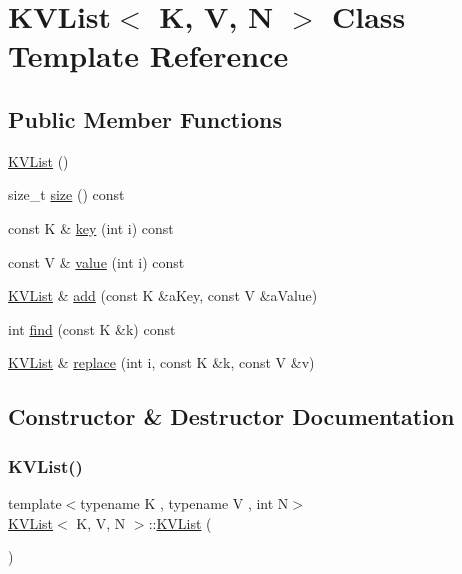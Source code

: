 \hypertarget{classKVList}{}\section{K\+V\+List$<$ K, V, N $>$ Class Template Reference}
\label{classKVList}
\subsection*{Public Member Functions}
\begin{DoxyCompactItemize}
\item 
\mbox{\hyperlink{classKVList_a252cba3f0d183beebdf8a545c748b8a3}{K\+V\+List}} ()
\item 
size\+\_\+t \mbox{\hyperlink{classKVList_a78553e3fffba19b64ae5d7404895070f}{size}} () const
\item 
const K \& \mbox{\hyperlink{classKVList_ad1abbfbdef9b9f7f79ed30cd259bc2c9}{key}} (int i) const
\item 
const V \& \mbox{\hyperlink{classKVList_a9e88a57305e260e0e372a025d2d7b024}{value}} (int i) const
\item 
\mbox{\hyperlink{classKVList}{K\+V\+List}} \& \mbox{\hyperlink{classKVList_ab0604395c2c4063eb1bab61983f018a9}{add}} (const K \&a\+Key, const V \&a\+Value)
\item 
int \mbox{\hyperlink{classKVList_aef6e6bcc30e6436b2ad957f3efcfb822}{find}} (const K \&k) const
\item 
\mbox{\hyperlink{classKVList}{K\+V\+List}} \& \mbox{\hyperlink{classKVList_a8f09811cd71f9ff582ae0cde60d2cbea}{replace}} (int i, const K \&k, const V \&v)
\end{DoxyCompactItemize}


\subsection{Constructor \& Destructor Documentation}
\mbox{\label{classKVList_a252cba3f0d183beebdf8a545c748b8a3}} 
\subsubsection{\texorpdfstring{K\+V\+List()}{KVList()}}
{\footnotesize\ttfamily template$<$typename K , typename V , int N$>$ \\
\mbox{\hyperlink{classKVList}{K\+V\+List}}$<$ K, V, N $>$\+::\mbox{\hyperlink{classKVList}{K\+V\+List}} (\begin{DoxyParamCaption}{ }\end{DoxyParamCaption})\hspace{0.3cm}{\ttfamily [inline]}}

